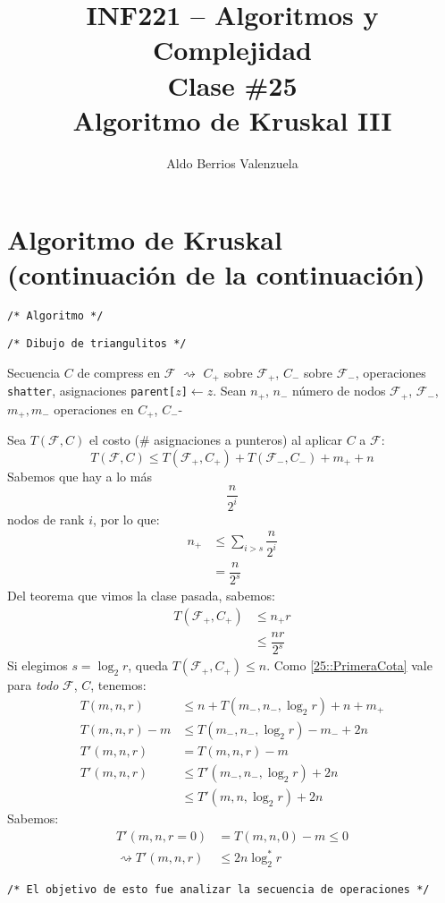 \documentclass[english, spanish, fleqn, 10pt]{article}
\author{Aldo Berrios Valenzuela}
\title{INF221 -- Algoritmos y Complejidad\\[.4\baselineskip]
Clase \#25\\
Algoritmo de Kruskal III}
\newcommand{\comentarioc}[1]{\texttt{\textcolor{webred}{/* #1 */}}}
\numberwithin{equation}{section}
\newcommand{\nparentesis}[1]{\left( #1 \right)}
\theoremstyle{definition}
\begin{document}
\maketitle

\section{Algoritmo de Kruskal (continuación de la continuación)}
\begin{center}
	\comentarioc{Algoritmo}
\end{center}
\begin{center}
	\comentarioc{Dibujo de triangulitos}
\end{center}
Secuencia $C$ de compress en $\mathcal{F}$ $\rightsquigarrow$ $C_{+}$ sobre $\mathcal{F}_{+}$, $C_-$ sobre $\mathcal F_-$, operaciones \texttt{shatter}, asignaciones \texttt{parent[}$z$\texttt{]}$ \leftarrow z$. Sean $n_+$, $n_-$ número de nodos $\mathcal F_+$, $\mathcal{F}_-$, $m_+, m_-$ operaciones en $C_+$, $C_-$-

Sea $T\nparentesis{\mathcal F, C}$ el costo (\# asignaciones a punteros) al aplicar $C$ a $\mathcal F$:
\begin{equation}\label{25::PrimeraCota}
T\nparentesis{\mathcal F, C} \leq T\nparentesis{\mathcal F_+, C_+} + T\nparentesis{\mathcal F_-, C_-} + m_+ + n
\end{equation}
Sabemos que hay a lo más
\begin{equation*}
\dfrac{n}{2^i}
\end{equation*}
nodos de rank $i$, por lo que:
\begin{align*}
n_+ &\leq \sum_{i > s}\dfrac{n}{2^i}\\
&=\dfrac{n}{2^s}
\end{align*}
Del teorema que vimos la clase pasada, sabemos:
\begin{align*}
T\nparentesis{\mathcal{F}_+, C_+} & \leq n_+ r\\
& \leq \dfrac{nr}{2^s}
\end{align*}
Si elegimos $s = \log _2 r$, queda $T\nparentesis{\mathcal F _+, C_+} \leq n$. Como \eqref{25::PrimeraCota} vale para \emph{todo} $\mathcal F$, $C$, tenemos:
\begin{align*}
T\nparentesis{m, n, r} &\leq n + T \nparentesis{m_-, n_-, \log_2 r} + n + m_+\\
T\nparentesis{m, n, r} - m &\leq T\nparentesis{m_-, n_-, \log_2r} - m_- + 2n\\
T'\nparentesis{m, n, r} &= T\nparentesis{m, n, r} - m\\
T'\nparentesis{m, n, r} & \leq T'\nparentesis{m_-, n_-, \log_2 r} + 2n\\
&\leq T'\nparentesis{m, n, \log_2 r} + 2n
\end{align*}
Sabemos:
\begin{align*}
T'\nparentesis{m, n, r=0} &= T\nparentesis{m, n, 0} - m \leq 0\\
\rightsquigarrow T'\nparentesis{m, n, r} &\leq 2n \log_2^* r
\end{align*}


\comentarioc{El objetivo de esto fue analizar la secuencia de operaciones}
\end{document}
